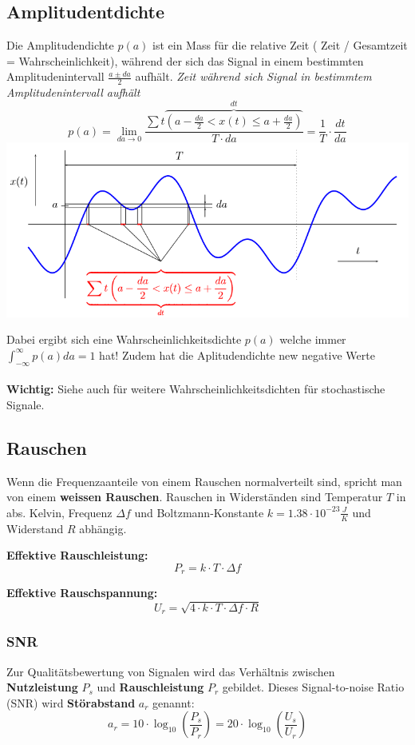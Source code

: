 \subsection{Amplitudentdichte}
Die Amplitudendichte $p(a)$ ist ein Mass für die relative Zeit ( Zeit /
Gesamtzeit = Wahrscheinlichkeit), während der sich das Signal in einem
bestimmten Amplitudenintervall $\frac{a\pm da}{2}$ aufhält. \textit{Zeit während
sich Signal in bestimmtem Amplitudenintervall aufhält}
\[
p(a) = \lim\limits_{da\rightarrow 0}\frac{\sum t\overbrace{\left(a - \frac{da}{2} < x(t) \leq a + \frac{da}{2}\right)}^{dt}}{T\cdot da} = \frac{1}{T} \cdot \frac{dt}{da}
\]
\includegraphics[width=\columnwidth]{Images/aplitudenspektrum}

Dabei ergibt sich eine Wahrscheinlichkeitsdichte $p(a)$ welche immer $\int_{-\infty}^{\infty}p(a)da = 1$ hat! Zudem hat die Aplitudendichte new negative Werte
~\\ ~\\
\textbf{Wichtig:} Siehe auch  für weitere Wahrscheinlichkeitsdichten für stochastische Signale.

\subsection{Rauschen}
Wenn die Frequenzaanteile von einem Rauschen normalverteilt sind, spricht man von einem \textbf{weissen Rauschen}. 
Rauschen in Widerständen sind Temperatur $T$ in abs. Kelvin, Frequenz $\Delta f$ und Boltzmann-Konstante $k = 1.38\cdot10^{-23}\frac{J}{K}$ und Widerstand $R$ abhängig.

\noindent \textbf{Effektive Rauschleistung:}
\[
P_r = k\cdot T\cdot \Delta f
\]

\noindent \textbf{Effektive Rauschspannung:}
\[
U_r = \sqrt{4\cdot k\cdot T\cdot \Delta f \cdot R}
\]

\subsubsection{SNR}
Zur Qualitätsbewertung von Signalen wird das Verhältnis zwischen \textbf{Nutzleistung} $P_s$ und \textbf{Rauschleistung} $P_r$ gebildet. Dieses Signal-to-noise Ratio (SNR) wird \textbf{Störabstand} $a_r$ genannt:
\[
a_r = 10\cdot \log_{10}\left(\frac{P_s}{P_r}\right) = 20\cdot \log_{10}\left(\frac{U_s}{U_r}\right)
\]

